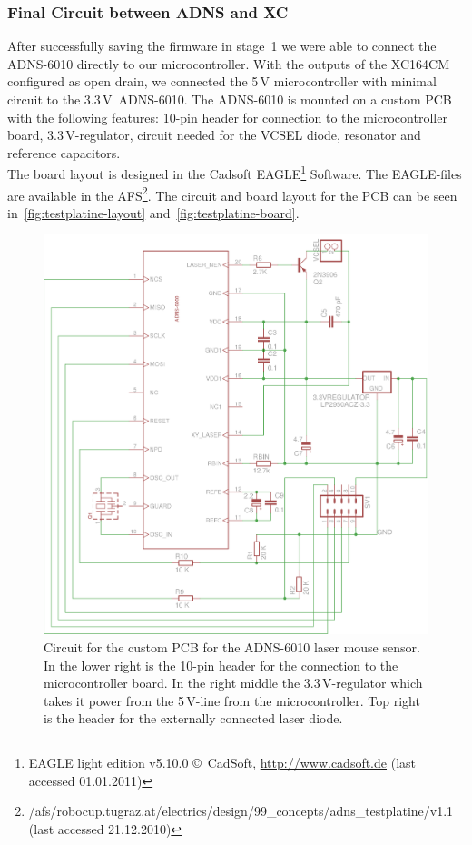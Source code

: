 \documentclass[12pt,a4paper]{article}
\begin{document}

\subsubsection{Final Circuit between ADNS and XC}
\label{adns-pcb}

After successfully saving the firmware in stage~1 we were able to connect the ADNS-6010 directly to our microcontroller.
With the outputs of the XC164CM configured as open drain, we connected the 5\,V microcontroller with minimal circuit to the 3.3\,V~ADNS-6010.
The ADNS-6010 is mounted on a custom PCB with the following features: 
10-pin header for connection to the microcontroller board,
\hbox{3.3\,V-regulator},
circuit needed for the VCSEL diode,
resonator and reference capacitors.\\
The board layout is designed in the Cadsoft EAGLE\footnote{EAGLE light edition v5.10.0 \copyright~CadSoft, \url{http://www.cadsoft.de} (last accessed 01.01.2011)} Software.
The EAGLE-files are available in the AFS\footnote{/afs/robocup.tugraz.at/electrics/design/99\_concepts/adns\_testplatine/v1.1 (last accessed 21.12.2010)}.
The circuit and board layout for the PCB can be seen in~\autoref{fig:testplatine-layout} and~\autoref{fig:testplatine-board}.

\begin{figure}[htbp]
\begin{center}
\includegraphics[width=1\columnwidth]{figures/schaltplan.png}
\caption{\label{fig:testplatine-layout}
Circuit for the custom PCB for the ADNS-6010 laser mouse sensor.
In the lower right is the 10-pin header for the connection to the microcontroller board.
In the right middle the 3.3\,V-regulator which takes it power from the 5\,V-line from the microcontroller.
Top right is the header for the externally connected laser diode.
}
\end{center}
\end{figure}
\end{document}
